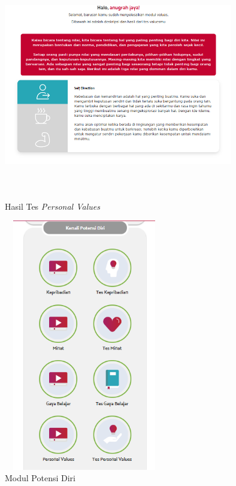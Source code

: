 \begin{enumerate}
\begin{enumerate}
            \begin{figure}[H]
                \centering
                \includegraphics[width = 10cm, height = 10cm]{doc/DokumenSkripsi/Gambar/gambar38.PNG}
                \caption{Hasil Tes \textit{Personal Values}}
                \label{fig:hasil tes personal values}
            \end{figure}
            
    \end{enumerate}
    
    \begin{figure}[H]
        \centering
        \includegraphics[width = 7cm, height = 11cm ]{Gambar/gambar34.PNG}
        \caption{Modul Potensi Diri}
        \label{fig:modul potensi diri}
    \end{figure}
    

\end{enumerate}
